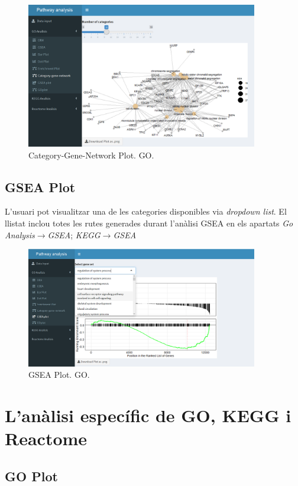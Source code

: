 \documentclass[]{article}
\begin{document}
\begin{figure}[H]
\centering
\includegraphics[width=0.9\textwidth]{App_F17_Items_GO_CnetPlot.png}  
\caption{Category-Gene-Network Plot. GO.}
\end{figure}

\subsection{GSEA Plot}
L'usuari pot visualitzar una de les categories disponibles via \textit{dropdown list}. El llistat inclou totes les rutes generades durant l'anàlisi GSEA en els apartats \textit{Go Analysis}$\rightarrow$\textit{GSEA}; \textit{KEGG}$\rightarrow$\textit{GSEA}
\begin{figure}[H]
\centering
\includegraphics[width=0.9\textwidth]{App_F18_Items_GO_GSEA_Plot.png}  
\caption{GSEA Plot. GO.}
\end{figure}


\section{L'anàlisi específic de GO, KEGG i Reactome}

\subsection{GO Plot}
\end{document}
